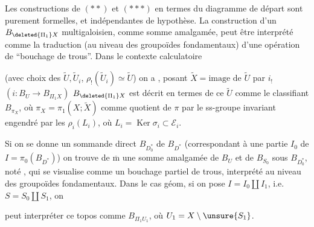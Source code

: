 Les constructions de $(**)$ et $(***)$ en termes du diagramme de départ
sont purement formelles, et indépendantes de  hypothèse.
La construction d'un $B_{\deleted{\Pi_1}X}$ multigaloisien, comme somme amalgamée, peut être interprété comme la traduction (au niveau des groupoïdes fondamentaux) d'une opération de ``bouchage de trous''.
 Dans le contexte calculatoire


(avec choix des $\widetilde U,\widetilde U_i$, $\rho_!(\widetilde U_i)\simeq\widetilde U$) on a
,
posant $\widetilde X=\text{image de }\widetilde U$ par $i_!$ $(i:B_U\longrightarrow B_{\Pi_1 X})$ $B_{\deleted{\Pi_1}X}$ est décrit en termes de ce $\widetilde U$ comme le  classifiant $B_{\pi_X}$, où $\pi_X=\pi_1(X;\widetilde X)$   comme quotient de $\pi$ par le ss-groupe invariant engendré par les $\rho_i(L_i)$, où $L_i=\operatorname{Ker}\sigma_i\subset\mathcal E_i$.

Si on se donne un sommande direct $B_{D_0^*}$ de $B_{D^*}$ (correspondant à une partie $I_0$ de $I=\pi_0(B_{D^*})$) on trouve de $\overline{\mathrm m}$ une somme amalgamée de $B_U$ et de $B_{S_0}$ sous $B_{D_0^*}$, noté  , qui se visualise comme un bouchage partiel de trous, interprété au niveau des groupoïdes fondamentaux. Dans le cas géom, si on pose $I=I_0\amalg I_1$, i.e. $S=S_0\amalg S_1$, on


peut interpréter ce topos comme $B_{\Pi_1 U_1}$, où $U_1=X\setminus\unsure{S_1}$. 


